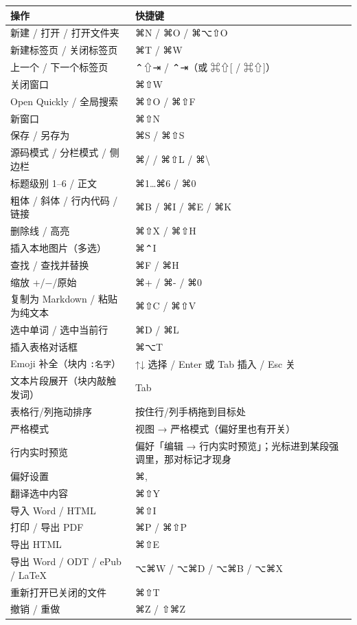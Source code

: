 \documentclass[11pt,a4paper]{ctexart}
\begin{document}
\begin{center}
\begin{tabular}{ll}
\hline
\textbf{操作} & \textbf{快捷键} \\
\hline
新建 / 打开 / 打开文件夹 & ⌘N / ⌘O / ⌘⌥⇧O \\
新建标签页 / 关闭标签页 & ⌘T / ⌘W \\
上一个 / 下一个标签页 & ⌃⇧⇥ / ⌃⇥（或 ⌘⇧[ / ⌘⇧]） \\
关闭窗口 & ⌘⇧W \\
Open Quickly / 全局搜索 & ⌘⇧O / ⌘⇧F \\
新窗口 & ⌘⇧N \\
保存 / 另存为 & ⌘S / ⌘⇧S \\
源码模式 / 分栏模式 / 侧边栏 & ⌘/ / ⌘⇧L / ⌘\textbackslash{} \\
标题级别 1–6 / 正文 & ⌘1…⌘6 / ⌘0 \\
粗体 / 斜体 / 行内代码 / 链接 & ⌘B / ⌘I / ⌘E / ⌘K \\
删除线 / 高亮 & ⌘⇧X / ⌘⇧H \\
插入本地图片（多选） & ⌘⌃I \\
查找 / 查找并替换 & ⌘F / ⌘H \\
缩放 +/−/原始 & ⌘+ / ⌘- / ⌘0 \\
复制为 Markdown / 粘贴为纯文本 & ⌘⇧C / ⌘⇧V \\
选中单词 / 选中当前行 & ⌘D / ⌘L \\
插入表格对话框 & ⌘⌥T \\
Emoji 补全（块内 \texttt{:名字}） & ↑↓ 选择 / Enter 或 Tab 插入 / Esc 关 \\
文本片段展开（块内敲触发词） & Tab \\
表格行/列拖动排序 & 按住行/列手柄拖到目标处 \\
严格模式 & 视图 → 严格模式（偏好里也有开关） \\
行内实时预览 & 偏好「编辑 → 行内实时预览」；光标进到某段强调里，那对标记才现身 \\
偏好设置 & ⌘, \\
翻译选中内容 & ⌘⇧Y \\
导入 Word / HTML & ⌘⇧I \\
打印 / 导出 PDF & ⌘P / ⌘⇧P \\
导出 HTML & ⌘⇧E \\
导出 Word / ODT / ePub / LaTeX & ⌥⌘W / ⌥⌘D / ⌥⌘B / ⌥⌘X \\
重新打开已关闭的文件 & ⌘⇧T \\
撤销 / 重做 & ⌘Z / ⇧⌘Z \\
\hline
\end{tabular}
\end{center}
\end{document}
